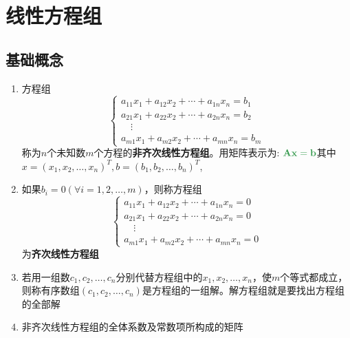 \documentclass[a4paper,12pt]{article}
\begin{document}


    \section{线性方程组}

    \subsection{基础概念}

    \begin{enumerate}
        \item 方程组
        \[
            \begin{cases}
                a_{11}x_1 + a_{12}x_2 + \cdots + a_{1n}x_n = b_1 \\
                a_{21}x_1 + a_{22}x_2 + \cdots + a_{2n}x_n = b_2 \\
                \quad \vdots \\
                a_{m1}x_1 + a_{m2}x_2 + \cdots + a_{mn}x_n = b_m
            \end{cases}
        \]
        称为$n$个未知数$m$个方程的\textbf{非齐次线性方程组}。用矩阵表示为: $\mathbf{\color[rgb]{0.2, 0.6, 0.3}{Ax = b}}$其中$x = (x_1, x_2, \dots, x_n)^T, b = (b_1, b_2, \dots, b_n)^T$,
        \item 如果$b_{i} = 0(\forall i = 1,2,\dots,m)$，则称方程组
        \[
            \begin{cases}
                a_{11}x_1 + a_{12}x_2 + \cdots + a_{1n}x_n = 0 \\
                a_{21}x_1 + a_{22}x_2 + \cdots + a_{2n}x_n = 0 \\
                \quad \vdots \\
                a_{m1}x_1 + a_{m2}x_2 + \cdots + a_{mn}x_n = 0
            \end{cases}
        \]
        为\textbf{齐次线性方程组}
        \item 若用一组数$c_1, c_2, \dots, c_n$分别代替方程组中的$x_1, x_2, \dots, x_n$，使$m$个等式都成立，则称有序数组$(c_1, c_2, \dots, c_n)$是方程组的一组解。解方程组就是要找出方程组的全部解
        \item 非齐次线性方程组的全体系数及常数项所构成的矩阵
        \[
\]
\end{enumerate}
\end{document}
